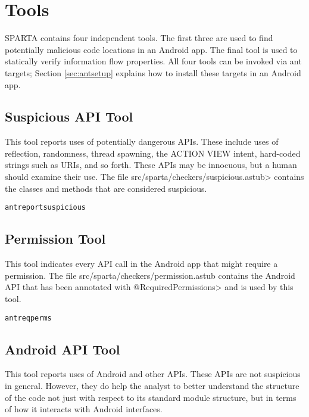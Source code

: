\htmlhr
\chapter{Tools\label{tools}}

SPARTA contains four independent tools.  The first three are used to find potentially malicious code
 locations in an Android app.  The final tool is used to statically verify information flow properties. 
  All four tools can be invoked via  ant targets;  Section
\ref{sec:antsetup} explains how to install these targets in an Android app.

\section{Suspicious API Tool\label{sec:suspicioustool}}

This tool reports uses of potentially dangerous APIs. These include uses of reflection, randomness, thread spawning, the ACTION VIEW intent, hard-coded strings such as URIs, and so forth. These APIs may be innocuous, but a human should examine their use.  The file \<src/sparta/checkers/suspicious.astub> contains the classes and methods that are considered suspicious.
 
\begin{alltt}
ant reportsuspicious
\end{alltt}

\section{Permission Tool\label{sec:permtool}}
  
This tool indicates every API call in the Android app that might require a permission.  The file src/sparta/checkers/permission.astub contains the Android API that has been annotated with \<@RequiredPermissions> and is used by this tool.

 \begin{alltt}
ant reqperms
\end{alltt}


\section{Android API Tool\label{sec:generaltool}}

This tool reports uses of Android and other APIs. These APIs are not suspicious in general. However, they do help the analyst to better understand the structure of the code not just with respect to its standard module structure, but in terms of how it interacts with Android interfaces. 


